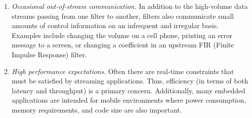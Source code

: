 \begin{enumerate}
\item \emph{Occasional out-of-stream communication.}  In addition to
  the  high-volume data streams  passing from  one filter  to another,
  filters also communicate small  amounts of control information on an
  infrequent  and  irregular  basis.   Examples include  changing  the
  volume on  a cell phone, printing  an error message to  a screen, or
  changing a coefficient in an upstream FIR (Finite Impulse Response) filter.
  
\item \emph{High performance expectations.}  Often there are real-time
  constraints that must be  satisfied by streaming applications. Thus,
  efficiency (in  terms of both  latency and throughput) is  a primary
  concern.  Additionally, many  embedded applications are intended for
  mobile  environments where  power consumption,  memory requirements,
  and code size are also important.
\end{enumerate}
